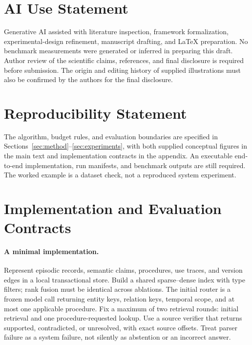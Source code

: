 \documentclass{article}
\begin{document}
\section*{AI Use Statement}
Generative AI assisted with literature inspection, framework formalization,
experimental-design refinement, manuscript drafting, and LaTeX preparation.
No benchmark measurements were generated or inferred in preparing this draft.
Author review of the scientific claims, references, and final disclosure is
required before submission. The origin and editing history of supplied
illustrations must also be confirmed by the authors for the final disclosure.

\section*{Reproducibility Statement}
The algorithm, budget rules, and evaluation boundaries are specified in
Sections~\ref{sec:method}--\ref{sec:experiments}, with both supplied conceptual
figures in the main text and implementation contracts in the appendix. An executable end-to-end
implementation, run manifests, and benchmark outputs are still required.
The worked example is a dataset check, not a reproduced system experiment.




\appendix
\clearpage
\section{Implementation and Evaluation Contracts}
\label{app:contracts}
\paragraph{A minimal implementation.}
Represent episodic records, semantic claims, procedures, use traces, and
version edges in a local transactional store. Build a shared sparse--dense
index with type filters; rank fusion must be identical across ablations.
The initial router is a frozen model call returning entity keys, relation
keys, temporal scope, and at most one applicable procedure. Fix a maximum
of two retrieval rounds: initial retrieval and one procedure-requested lookup.
Use a source verifier that returns supported, contradicted, or unresolved,
with exact source offsets. Treat parser failure as a system failure, not
silently as abstention or an incorrect answer.
\end{document}
